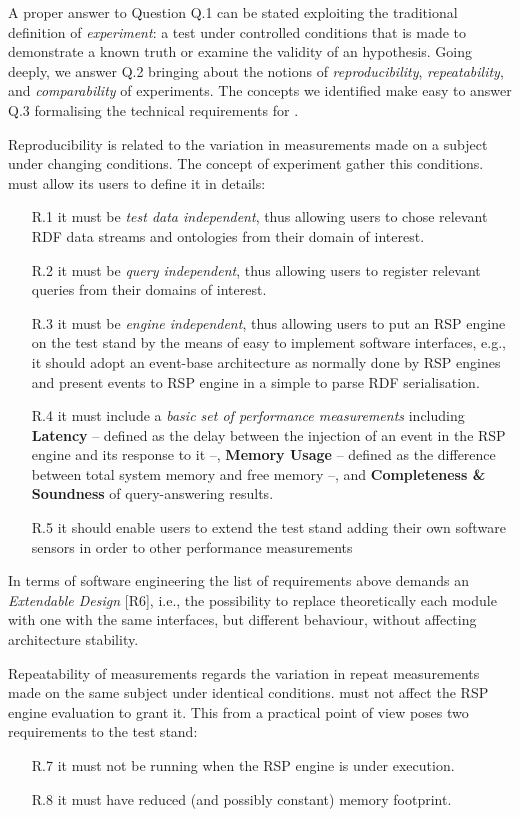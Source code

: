 A proper answer to Question Q.1 can be stated exploiting the traditional definition of \textit{experiment}: a test under controlled conditions that is made to demonstrate a known truth or examine the validity of an hypothesis. Going deeply, we answer Q.2 bringing about the notions of \textit{reproducibility}, \textit{repeatability}, and \textit{comparability} of experiments. The concepts we identified make easy to answer Q.3 formalising the technical requirements for \namens.

Reproducibility is related to the variation in measurements made on a subject under changing conditions. The concept of experiment gather this conditions. \name must allow its users to define it in details: 
\begin{enumerate}
\item[R.1] it must be \textit{test data independent}, thus allowing users to chose relevant RDF data streams and ontologies from their domain of interest. %
\item[R.2] it must be \textit{query independent}, thus allowing users to register relevant queries from their domains of interest. %
\item[R.3] it must be \textit{engine independent}, thus allowing users to put an RSP engine on the test stand by the means of easy to implement software interfaces, e.g., it should adopt an event-base architecture as normally done by RSP engines and present events to RSP engine in a simple to parse RDF serialisation. %
\item[R.4] it must include a \textit{basic set of performance measurements} \cite{DBLP:conf/esws/ScharrenbachUMVB13} including \textbf{Latency} -- defined as the delay between the injection of an event in the RSP engine and its response to it --, \textbf{Memory Usage} -- defined as the difference between total system memory and free memory --, and \textbf{Completeness \& Soundness} of query-answering results.  %
\item[R.5] it should enable users to extend the test stand adding their own software sensors in order to other performance measurements %
\end{enumerate}

In terms of software engineering the list of requirements above demands an \textit{Extendable Design} [R6], i.e.,  the possibility to replace theoretically each module with one with the same interfaces, but different behaviour, without affecting architecture stability.

Repeatability of measurements regards the variation in repeat measurements made on the same subject under identical conditions. \name must not affect the RSP engine evaluation to grant it. This from a practical point of view poses two requirements to the test stand:
\begin{enumerate}
\item[R.7] it must not be running when the RSP engine is under execution. %
\item[R.8] it must have reduced (and possibly constant) memory footprint. %
\end{enumerate}


